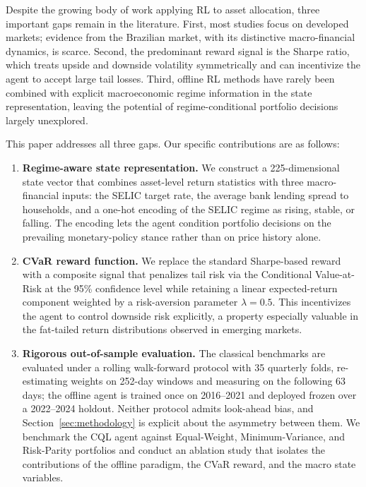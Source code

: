 Despite the growing body of work applying RL to asset allocation, three important
gaps remain in the literature.
First, most studies focus on developed markets; evidence from the Brazilian market,
with its distinctive macro-financial dynamics, is scarce.
Second, the predominant reward signal is the Sharpe ratio, which treats upside and
downside volatility symmetrically and can incentivize the agent to accept large tail
losses.
Third, offline RL methods have rarely been combined with explicit macroeconomic
regime information in the state representation, leaving the potential of
regime-conditional portfolio decisions largely unexplored.

This paper addresses all three gaps.
Our specific contributions are as follows:

\begin{enumerate}
  \item \textbf{Regime-aware state representation.}
        We construct a 225-dimensional state vector that combines asset-level
        return statistics with three macro-financial inputs: the SELIC target
        rate, the average bank lending spread to households, and a one-hot
        encoding of the SELIC regime as rising, stable, or falling.
        The encoding lets the agent condition portfolio decisions on the
        prevailing monetary-policy stance rather than on price history alone.

  \item \textbf{CVaR reward function.}
        We replace the standard Sharpe-based reward with a composite signal that
        penalizes tail risk via the Conditional Value-at-Risk at the 95\%
        confidence level while retaining a linear expected-return component
        weighted by a risk-aversion parameter $\lambda = 0.5$.
        This incentivizes the agent to control downside risk explicitly, a
        property especially valuable in the fat-tailed return distributions
        observed in emerging markets.

  \item \textbf{Rigorous out-of-sample evaluation.}
        The classical benchmarks are evaluated under a rolling walk-forward
        protocol with 35 quarterly folds, re-estimating weights on 252-day
        windows and measuring on the following 63 days; the offline agent is
        trained once on 2016--2021 and deployed frozen over a 2022--2024 holdout.
        Neither protocol admits look-ahead bias, and Section~\ref{sec:methodology}
        is explicit about the asymmetry between them.
        We benchmark the CQL agent against Equal-Weight, Minimum-Variance, and
        Risk-Parity portfolios and conduct an ablation study that isolates the
        contributions of the offline paradigm, the CVaR reward, and the macro
        state variables.
\end{enumerate}

